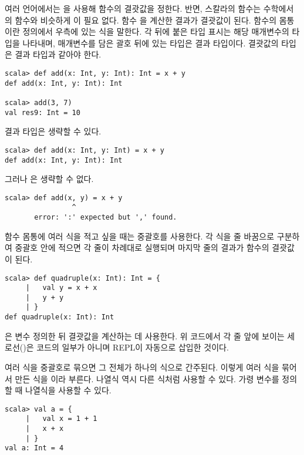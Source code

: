 여러 언어에서는 을 사용해 함수의 결괏값을 정한다. 반면,
스칼라의 함수는 수학에서의 함수와 비슷하게 이 필요 없다. 함수
을
계산한 결과가 결괏값이 된다. 함수의 몸통이란 정의에서 \code{=} 우측에 있는 식을 말한다.
각  뒤에 붙은 타입 표시는 해당 매개변수의 타입을 나타내며,
매개변수를 담은 괄호 뒤에 있는 타입은 결과 타입이다. 결괏값의
타입은 결과 타입과 같아야 한다.

\begin{verbatim}
scala> def add(x: Int, y: Int): Int = x + y
def add(x: Int, y: Int): Int

scala> add(3, 7)
val res9: Int = 10
\end{verbatim}

결과 타입은 생략할 수 있다.

\begin{verbatim}
scala> def add(x: Int, y: Int) = x + y
def add(x: Int, y: Int): Int
\end{verbatim}

그러나 은 생략할 수 없다.

\begin{verbatim}
scala> def add(x, y) = x + y
                ^
       error: ':' expected but ',' found.
\end{verbatim}

함수 몸통에 여러 식을 적고 싶을 때는 중괄호를 사용한다. 각 식을 줄 바꿈으로
구분하여 중괄호 안에 적으면 각 줄이 차례대로 실행되며 마지막 줄의 결과가 함수의
결괏값이 된다.

\begin{verbatim}
scala> def quadruple(x: Int): Int = {
     |   val y = x + x
     |   y + y
     | }
def quadruple(x: Int): Int
\end{verbatim}

은 변수  정의한 뒤 결괏값을 계산하는 데  사용한다. 위 코드에서 각
줄 앞에 보이는 세로선(\code{|})은 코드의 일부가 아니며 REPL이 자동으로 삽입한 것이다.

여러 식을 중괄호로 묶으면 그 전체가 하나의 식으로 간주된다. 이렇게 여러 식을
묶어서 만든 식을 이라 부른다. 나열식 역시 다른
식처럼 사용할 수 있다. 가령 변수를 정의할 때 나열식을 사용할 수 있다.

\begin{verbatim}
scala> val a = {
     |   val x = 1 + 1
     |   x + x
     | }
val a: Int = 4
\end{verbatim}

